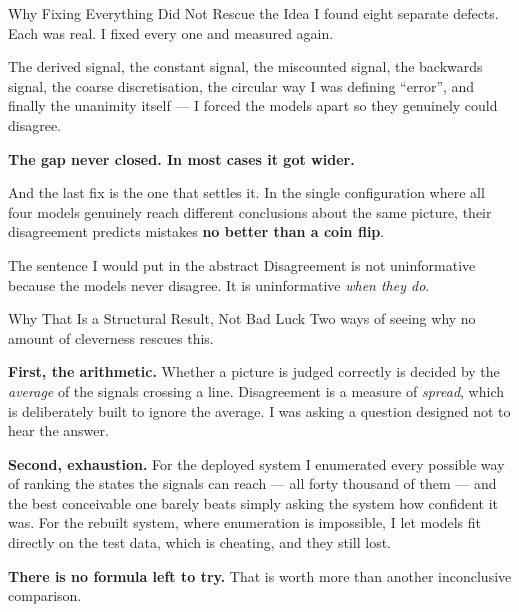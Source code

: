 \documentclass[aspectratio=169,11pt]{beamer}
\begin{document}
\begin{frame}{Why Fixing Everything Did Not Rescue the Idea}
\small
I found eight separate defects. Each was real. I fixed every one and measured again.
\vspace{2mm}

\small
The derived signal, the constant signal, the miscounted signal, the backwards signal, the coarse discretisation, the circular way I was defining ``error'', and finally the unanimity itself --- I forced the models apart so they genuinely could disagree.
\vspace{2mm}

\textbf{The gap never closed. In most cases it got wider.}
\vspace{2mm}

And the last fix is the one that settles it. In the single configuration where all four models genuinely reach different conclusions about the same picture, their disagreement predicts mistakes \textbf{no better than a coin flip}.
\vspace{2mm}

\begin{alertblock}{\small The sentence I would put in the abstract}
Disagreement is not uninformative because the models never disagree. It is uninformative \emph{when they do}.
\end{alertblock}
\end{frame}

\begin{frame}{Why That Is a Structural Result, Not Bad Luck}
\small
Two ways of seeing why no amount of cleverness rescues this.
\vspace{2mm}

\small
\textbf{First, the arithmetic.} Whether a picture is judged correctly is decided by the \emph{average} of the signals crossing a line. Disagreement is a measure of \emph{spread}, which is deliberately built to ignore the average. I was asking a question designed not to hear the answer.
\vspace{2mm}

\textbf{Second, exhaustion.} For the deployed system I enumerated every possible way of ranking the states the signals can reach --- all forty thousand of them --- and the best conceivable one barely beats simply asking the system how confident it was. For the rebuilt system, where enumeration is impossible, I let models fit directly on the test data, which is cheating, and they still lost.
\vspace{2mm}

\textbf{There is no formula left to try.} That is worth more than another inconclusive comparison.
\end{frame}
\end{document}

